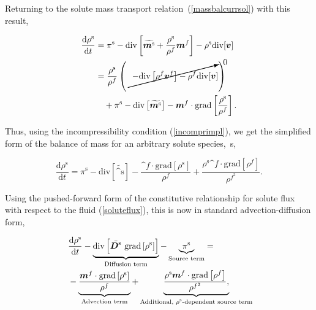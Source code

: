 \noindent Returning to the solute mass transport
relation~(\ref{massbalcurrsol}) with this result,

\begin{equation}
\begin{split}
\frac{\mathrm{d}\rho^\mathrm{s}}{\mathrm{d}t} &= \pi^\mathrm{s}-
\mathrm{div} \left[\widetilde{\bm^\mathrm{s}}+
\frac{\rho^\mathrm{s}}{\rho^f}\bm^f\right] - \rho^\mathrm{s}
\mathrm{div}[\bv]\\ &= \frac{\rho^\mathrm{s}}{\rho^f}\left(\cancelto{0}
{-\mathrm{div}\left[\rho^f \bv^{f}\right] - \rho^f
\mathrm{div}[\bv]}\right)\\ &\quad{} + \pi^\mathrm{s} -
\mathrm{div}\left[\widetilde{\bm^\mathrm{s}}\right]
-\bm^f\cdot\mathrm{grad}\left[\frac{ \rho^\mathrm{s}}{\rho^f}\right].\\
\end{split}
\end{equation}

\noindent Thus, using the incompressibility condition
(\ref{incomprimpl}), we get the simplified form of the balance of mass
for an arbitrary solute species,~s,

\begin{equation}
\frac{\mathrm{d}\rho^\mathrm{s}}{\mathrm{d}t}=\pi^\mathrm{s} -
\mathrm{div}\left[\widetilde{\bm^\mathrm{s}}\right] -
\frac{\bm^f\cdot\mathrm{grad}\left[\rho^\mathrm{s}\right]}{\rho^f} +
\frac{\rho^\mathrm{s} \bm^f \cdot \mathrm{grad}\left[\rho^f\right]}
{\rho^{f^2}}.
\label{stdform}
\end{equation}

\noindent Using the pushed-forward form of the constitutive
relationship for solute flux with respect to the fluid
(\ref{soluteflux}), this is now in standard advection-diffusion form,

\begin{equation}
\begin{split}
& \frac{\mathrm{d}\rho^\mathrm{s}}{\mathrm{d}t} - \underbrace{
    \mathrm{div}\left[\bar{\mbox{\boldmath$ D$}^\mathrm{s}}\ \mathrm{grad} \left[
        \rho^\mathrm{s}\right]\right]}_\text{Diffusion term} -
  \underbrace{\pi^\mathrm{s}}_\text{Source term} = \\ \ & -
  \underbrace{\frac{\mbox{\boldmath$ m$}^f\cdot\mathrm{grad}
      \left[\rho^\mathrm{s}\right]}{\rho^f}} _\text{Advection term} +
  \underbrace{ \frac{\rho^\mathrm{s} \mbox{\boldmath$ m$}^f \cdot
      \mathrm{grad}\left[\rho^f\right]}
    {\rho^{f^2}},}_\text{Additional, $\rho^\mathrm{s}$-dependent
    source term}
\end{split}
\label{morestdform}
\end{equation}

